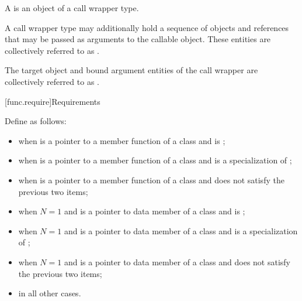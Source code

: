 \pnum
A  is an object of a call wrapper type.

\pnum
A call wrapper type may additionally hold
a sequence of objects and references
that may be passed as arguments to the callable object.
These entities are collectively referred to
as .

\pnum
The target object and bound argument entities of the call wrapper are
collectively referred to as .

[func.require]{Requirements}

\pnum
{}%
%
Define  as follows:
\begin{itemize}
\item {} when  is a pointer to a
member function of a class 
and
 is ;

\item {} when  is a pointer to a
member function of a class 
and  is a specialization of ;

\item {} when  is a pointer to a
member function of a class 
and  does not satisfy the previous two items;

\item {} when $N = 1$ and  is a pointer to
data member of a class 
and
 is ;

\item {} when $N = 1$ and  is a pointer to
data member of a class 
and  is a specialization of ;

\item {} when $N = 1$ and  is a pointer to
data member of a class 
and  does not satisfy the previous two items;

\item {} in all other cases.
\end{itemize}

